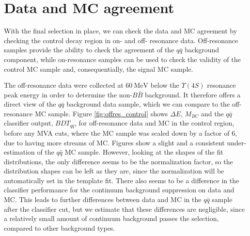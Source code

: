 \documentclass[headings=standardclasses,headings=big,oneside,a4paper,openany,12pt]{scrbook}
\newcommand {\e}[1]{\mathrm{~#1}}
\begin{document}
\section{Data and MC agreement}

With the final selection in place, we can check the data and MC agreement by checking the control decay region in on- and off- resonance data. Off-resonance samples provide the ability to check the agreement of the $q\bar q$ background component, while on-resonance samples can be used to check the validity of the control MC sample and, consequentially, the signal MC sample.

The off-resonance data were collected at $60\e{MeV}$ below the $\Upsilon(4S)$ resonance peak energy in order to determine the non-$B\bar B$ background. It therefore offers a direct view of the $q\bar q$ background data sample, which we can compare to the off-resonance MC sample. Figure \ref{fig:offres_control} shows $\Delta E$, $M_{BC}$ and the $q \bar q$ classifier output, $BDT_{q\bar q}$, for off-resonance data and MC in the control region, before any MVA cuts, where the MC sample was scaled down by a factor of $6$, due to having more streams of MC. Figures show a slight and a consistent under-estimation of the $q\bar q$ MC sample. However, looking at the shapes of the fit distributions, the only difference seems to be the normalization factor, so the distribution shapes can be left as they are, since the normalization will be automatically set in the template fit. There also seems to be a difference in the classifier performance for the continuum background suppression on data and MC. This leads to further differences between data and MC in the $q \bar q$ sample after the classifier cut, but we estimate that these differences are negligible, since a relatively small amount of continuum background passes the selection, compared to other background types.
\end{document}
